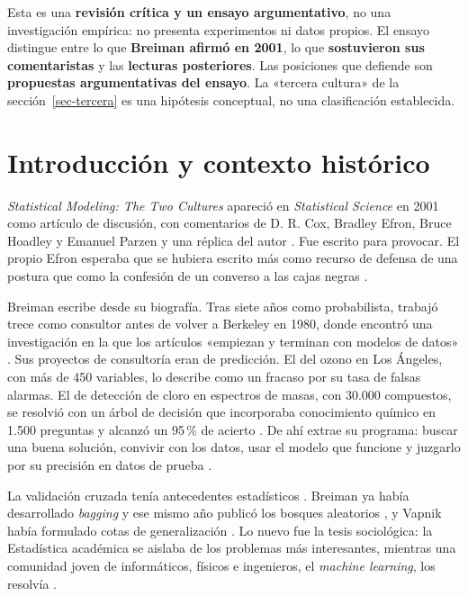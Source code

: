 \documentclass[11pt,a4paper]{article}
\begin{document}
\begin{recuadro}
Esta es una \textbf{revisión crítica y un ensayo argumentativo}, no una investigación empírica: no presenta experimentos ni datos propios. El ensayo distingue entre lo que \textbf{Breiman afirmó en 2001}, lo que \textbf{sostuvieron sus comentaristas} y las \textbf{lecturas posteriores}. Las posiciones que defiende son \textbf{propuestas argumentativas del ensayo}. La «tercera cultura» de la sección~\ref{sec-tercera} es una hipótesis conceptual, no una clasificación establecida.
\end{recuadro}



\section{Introducción y contexto histórico}\label{sec-intro}

\emph{Statistical Modeling: The Two Cultures} apareció en \emph{Statistical Science} en 2001 como artículo de discusión, con comentarios de D. R. Cox, Bradley Efron, Bruce Hoadley y Emanuel Parzen y una réplica del autor \autocite{breiman2001}. Fue escrito para provocar. El propio Efron esperaba que se hubiera escrito más como recurso de defensa de una postura que como la confesión de un converso a las cajas negras \autocite[219]{breiman2001}.

Breiman escribe desde su biografía. Tras siete años como probabilista, trabajó trece como consultor antes de volver a Berkeley en 1980, donde encontró una investigación en la que los artículos «empiezan y terminan con modelos de datos» \autocite[200]{breiman2001}. Sus proyectos de consultoría eran de predicción. El del ozono en Los Ángeles, con más de 450 variables, lo describe como un fracaso por su tasa de falsas alarmas. El de detección de cloro en espectros de masas, con 30.000 compuestos, se resolvió con un árbol de decisión que incorporaba conocimiento químico en 1.500 preguntas y alcanzó un 95\,\% de acierto \autocite[200--201]{breiman2001}. De ahí extrae su programa: buscar una buena solución, convivir con los datos, usar el modelo que funcione y juzgarlo por su precisión en datos de prueba \autocite[201]{breiman2001}.

La validación cruzada tenía antecedentes estadísticos \autocite{stone1974}. Breiman ya había desarrollado \emph{bagging} y ese mismo año publicó los bosques aleatorios \autocite{breiman1996bagging,breiman2001rf}, y Vapnik había formulado cotas de generalización \autocite{vapnik1995}. Lo nuevo fue la tesis sociológica: la Estadística académica se aislaba de los problemas más interesantes, mientras una comunidad joven de informáticos, físicos e ingenieros, el \emph{machine learning}, los resolvía \autocite[205]{breiman2001}.
\end{document}
